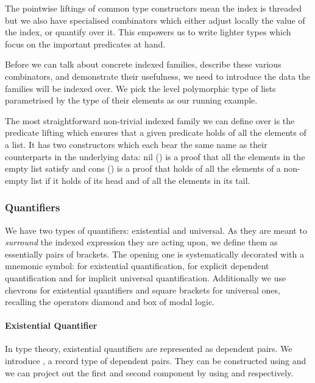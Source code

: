 The pointwise liftings of common type constructors mean the index is
threaded but we also have specialised combinators which either adjust
locally the value of the index, or quantify over it. This empowers
us to write lighter types which focus on the important predicates at
hand.

Before we can talk about concrete indexed families, describe these
various combinators, and demonstrate their usefulness, we need to
introduce the data the families will be indexed over. We pick 
the level polymorphic type of lists parametrised by the type of their
elements as our running example.


The most straightforward non-trivial indexed family we can define over
 is the predicate lifting  which ensures that a given
predicate  holds of all the elements of a list. It has two
constructors which each bear the same name as their counterparts in the
underlying data: nil (\AIC{[]}) is a proof that all the elements in the
empty list satisfy  and cons (\AIC{\_::\_}) is a proof that 
holds of all the elements of a non-empty list if it holds of its head
and of all the elements in its tail.


\subsubsection{Quantifiers}

We have two types of quantifiers: existential and universal. As they are
meant to \emph{surround} the indexed expression they are acting upon, we
define them as essentially pairs of brackets. The opening one is systematically
decorated with a mnemonic symbol:  for existential quantification,
 for explicit dependent quantification and  for implicit
universal quantification. Additionally we use chevrons for existential
quantifiers and square brackets for universal ones, recalling the operators
diamond and box of modal logic.

\paragraph{Existential Quantifier}\label{def:sigma} In type theory, existential
quantifiers are represented as dependent pairs. We introduce , a record
type of dependent pairs. They can be constructed using \AIC{\_,\_} and we can
project out the first and second component by using  and 
respectively.

